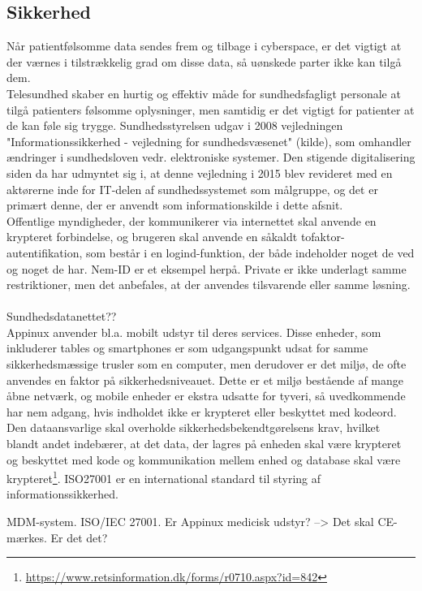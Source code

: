 \subsection{Sikkerhed}
Når patientfølsomme data sendes frem og tilbage i cyberspace, er det vigtigt at der værnes i tilstrækkelig grad om disse data, så uønskede parter ikke kan tilgå dem.\\
Telesundhed skaber en hurtig og effektiv måde for sundhedsfagligt personale at tilgå patienters følsomme oplysninger, men samtidig er det vigtigt for patienter at de kan føle sig trygge. Sundhedsstyrelsen udgav i 2008 vejledningen "Informationssikkerhed - vejledning for sundhedsvæsenet" (kilde), som omhandler ændringer i sundhedsloven vedr. elektroniske systemer. Den stigende digitalisering siden da har udmyntet sig i, at denne vejledning i 2015 blev revideret med en aktørerne inde for IT-delen af sundhedssystemet som målgruppe, og det er primært denne, der er anvendt som informationskilde i dette afsnit.\\
Offentlige myndigheder, der kommunikerer via internettet skal anvende en krypteret forbindelse, og brugeren skal anvende en såkaldt tofaktor-autentifikation, som består i en logind-funktion, der både indeholder noget de ved og noget de har. Nem-ID er et eksempel herpå. Private er ikke underlagt samme restriktioner, men det anbefales, at der anvendes tilsvarende eller samme løsning.\\ \\
Sundhedsdatanettet??\\
Appinux anvender bl.a. mobilt udstyr til deres services. Disse enheder, som inkluderer tables og smartphones er som udgangspunkt udsat for samme sikkerhedsmæssige trusler som en computer, men derudover er det miljø, de ofte anvendes en faktor på sikkerhedsniveauet. Dette er et miljø bestående af mange åbne netværk, og mobile enheder er ekstra udsatte for tyveri, så uvedkommende har nem adgang, hvis indholdet ikke er krypteret eller beskyttet med kodeord.\\Den dataansvarlige skal overholde sikkerhedsbekendtgørelsens krav, hvilket blandt andet indebærer, at det data, der lagres på enheden skal være krypteret og beskyttet med kode og kommunikation mellem enhed og database skal være krypteret\footnote{\url{https://www.retsinformation.dk/forms/r0710.aspx?id=842}}. ISO27001 er en international standard til styring af informationssikkerhed.

MDM-system. ISO/IEC 27001. Er Appinux medicisk udstyr? --> Det skal CE-mærkes. Er det det?

